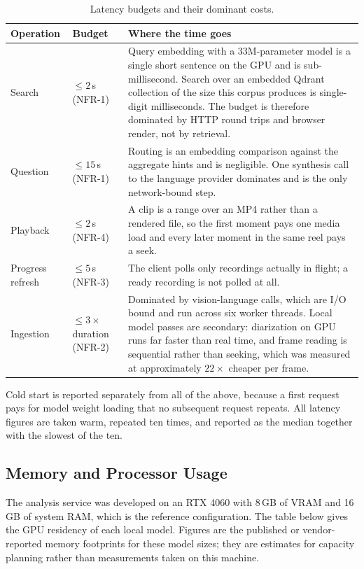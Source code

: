 \documentclass[11pt,a4paper]{article}
\begin{document}
\begin{table}[htbp]
\centering
\small
\begin{tabularx}{\textwidth}{@{}L{2.6cm}L{1.9cm}X@{}}
\toprule
\textbf{Operation} & \textbf{Budget} & \textbf{Where the time goes} \\
\midrule
Search & $\leq 2$\,s (NFR-1) & Query embedding with a 33M-parameter model is a single short sentence on the GPU and is sub-millisecond. Search over an embedded Qdrant collection of the size this corpus produces is single-digit milliseconds. The budget is therefore dominated by HTTP round trips and browser render, not by retrieval. \\
Question & $\leq 15$\,s (NFR-1) & Routing is an embedding comparison against the aggregate hints and is negligible. One synthesis call to the language provider dominates and is the only network-bound step. \\
Playback & $\leq 2$\,s (NFR-4) & A clip is a range over an MP4 rather than a rendered file, so the first moment pays one media load and every later moment in the same reel pays a seek. \\
Progress refresh & $\leq 5$\,s (NFR-3) & The client polls only recordings actually in flight; a ready recording is not polled at all. \\
Ingestion & $\leq 3\times$ duration (NFR-2) & Dominated by vision-language calls, which are I/O bound and run across six worker threads. Local model passes are secondary: diarization on GPU runs far faster than real time, and frame reading is sequential rather than seeking, which was measured at approximately $22\times$ cheaper per frame. \\
\bottomrule
\end{tabularx}
\caption{Latency budgets and their dominant costs.}
\end{table}

Cold start is reported separately from all of the above, because a first request
pays for model weight loading that no subsequent request repeats. All latency
figures are taken warm, repeated ten times, and reported as the median together
with the slowest of the ten.

\subsection{Memory and Processor Usage}

The analysis service was developed on an RTX 4060 with 8\,GB of VRAM and 16\,GB
of system RAM, which is the reference configuration. The table below gives the
GPU residency of each local model. Figures are the published or vendor-reported
memory footprints for these model sizes; they are estimates for capacity
planning rather than measurements taken on this machine.
\end{document}
